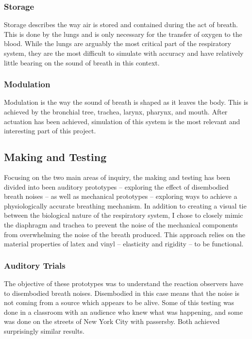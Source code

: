 \documentclass[letterpaper]{article}
\begin{document}
\subsubsection{Storage}

Storage describes the way air is stored and contained during the act of breath. This is done by the lungs and is only necessary for the transfer of oxygen to the blood. While the lungs are arguably the most critical part of the respiratory system, they are the most difficult to simulate with accuracy and have relatively little bearing on the sound of breath in this context.

\subsubsection{Modulation}

Modulation is the way the sound of breath is shaped as it leaves the body. This is achieved by the bronchial tree, trachea, larynx, pharynx, and mouth.\cite{sarkar} After actuation has been achieved, simulation of this system is the most relevant and interesting part of this project.   

\subsection{Making and Testing}

Focusing on the two main areas of inquiry, the making and testing has been divided into been auditory prototypes -- exploring the effect of disembodied breath noises -- as well as mechanical prototypes -- exploring ways to achieve a physiologically accurate breathing mechanism. In addition to creating a visual tie between the biological nature of the respiratory system, I chose to closely mimic the diaphragm and trachea to prevent the noise of the mechanical components from overwhelming the noise of the breath produced. This approach relies on the material properties of latex and vinyl -- elasticity and rigidity -- to be functional.

\subsubsection{Auditory Trials}

The objective of these prototypes was to understand the reaction observers have to disembodied breath noises. Disembodied in this case means that the noise is not coming from a source which appears to be alive. Some of this testing was done in a classroom with an audience who knew what was happening, and some was done on the streets of New York City with passersby. Both achieved surprisingly similar results. 
\end{document}

